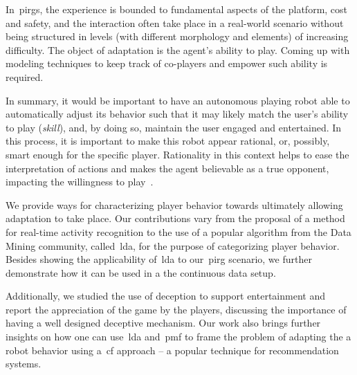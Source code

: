 In~\glspl{pirg}, the experience is bounded to fundamental aspects of the platform, \eg cost and safety, and the interaction often take place in a real-world scenario without being structured in levels (with different morphology and elements) of increasing difficulty. The object of adaptation is the agent's ability to play. Coming up with modeling techniques to keep track of co-players and empower such ability is required.

In summary, it would be important to have an autonomous playing robot able to automatically adjust its behavior such that it may likely match the user's ability to play (\textit{skill}), and, by doing so, maintain the user engaged and entertained. In this process, it is important to make this robot appear rational, or, possibly, smart enough for the specific player. Rationality in this context helps to ease the interpretation of actions and makes the agent believable as a true opponent, impacting the willingness to play~\citep{martinoia_physically_2013, bonarini_timing_2014}. 

We provide ways for characterizing player behavior towards ultimately allowing adaptation to take place. Our contributions vary from the proposal of a method for real-time activity recognition to the use of a popular algorithm from the Data Mining community, called~\acrfull{lda}, for the purpose of categorizing player behavior. Besides showing the applicability of~\gls{lda} to our~\gls{pirg} scenario, we further demonstrate how it can be used in a the continuous data setup.

Additionally, we studied the use of deception to support entertainment and report the appreciation of the game by the players, discussing the importance of having a well designed deceptive mechanism. Our work also brings further insights on how one can use~\gls{lda} and~\gls{pmf} to frame the problem of adapting the a robot behavior using a~\gls{cf} approach -- a popular technique for recommendation systems.


